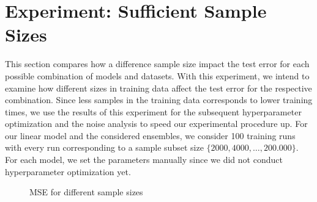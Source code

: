 \section{Experiment: Sufficient Sample Sizes}\label{sec:samplesize}

This section compares how a difference sample size impact the test error for each possible combination of models and datasets. With this experiment, we intend to examine how different sizes in training data affect the test error for the respective combination. Since less samples in the training data corresponds to lower training times, we use the results of this experiment for the subsequent hyperparameter optimization and the noise analysis to speed our experimental procedure up. For our linear model and the considered ensembles, we consider 100 training runs with every run corresponding to a sample subset size $ \{2000, 4000, \dots, 200.000\} $. For each model, we set the parameters manually since we did not conduct hyperparameter optimization yet. 

\begin{figure}[h]
	\centering
	\caption{MSE for different sample sizes}
	\label{fig:convergences}
\end{figure}

